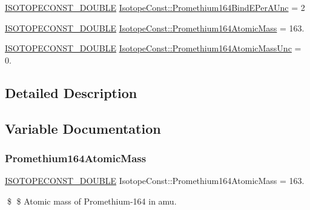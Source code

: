 \begin{DoxyCompactItemize}
\mbox{\hyperlink{group___isotope_const-_macros_ga8f45a7272ce02c0b4c65c44636ed719a}{I\+S\+O\+T\+O\+P\+E\+C\+O\+N\+S\+T\+\_\+\+D\+O\+U\+B\+LE}} \mbox{\hyperlink{group___isotope_const-_promethium-_pm164_gafd3dfbb499b587c9133bb84f851737e3}{Isotope\+Const\+::\+Promethium164\+Bind\+E\+Per\+A\+Unc}} = 2
\item 
\mbox{\hyperlink{group___isotope_const-_macros_ga8f45a7272ce02c0b4c65c44636ed719a}{I\+S\+O\+T\+O\+P\+E\+C\+O\+N\+S\+T\+\_\+\+D\+O\+U\+B\+LE}} \mbox{\hyperlink{group___isotope_const-_promethium-_pm164_ga39bad7e956d2a8e5714fc68ad07a2b30}{Isotope\+Const\+::\+Promethium164\+Atomic\+Mass}} = 163.
\item 
\mbox{\hyperlink{group___isotope_const-_macros_ga8f45a7272ce02c0b4c65c44636ed719a}{I\+S\+O\+T\+O\+P\+E\+C\+O\+N\+S\+T\+\_\+\+D\+O\+U\+B\+LE}} \mbox{\hyperlink{group___isotope_const-_promethium-_pm164_ga8fc98370fd2339e41eb30d6a2dc39c2d}{Isotope\+Const\+::\+Promethium164\+Atomic\+Mass\+Unc}} = 0.
\end{DoxyCompactItemize}


\subsection{Detailed Description}


\subsection{Variable Documentation}
\mbox{\label{group___isotope_const-_promethium-_pm164_ga39bad7e956d2a8e5714fc68ad07a2b30}} 
\subsubsection{\texorpdfstring{Promethium164\+Atomic\+Mass}{Promethium164AtomicMass}}
{\footnotesize\ttfamily \mbox{\hyperlink{group___isotope_const-_macros_ga8f45a7272ce02c0b4c65c44636ed719a}{I\+S\+O\+T\+O\+P\+E\+C\+O\+N\+S\+T\+\_\+\+D\+O\+U\+B\+LE}} Isotope\+Const\+::\+Promethium164\+Atomic\+Mass = 163.}

\$ \$ Atomic mass of Promethium-\/164 in amu. \mbox{\label{group___isotope_const-_promethium-_pm164_ga8fc98370fd2339e41eb30d6a2dc39c2d}} 
